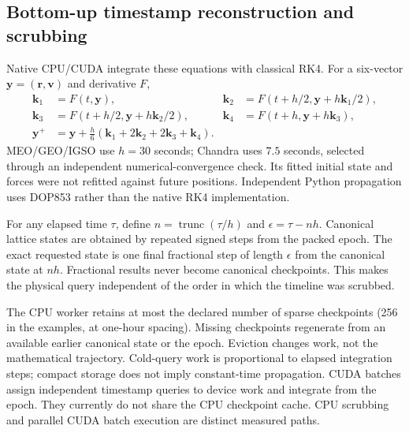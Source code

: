 \subsection{Bottom-up timestamp reconstruction and scrubbing}
Native CPU/CUDA integrate these equations with classical RK4. For a six-vector
$\mathbf y=(\mathbf r,\mathbf v)$ and derivative $F$,
\begin{align}
\mathbf k_1&=F(t,\mathbf y),&
\mathbf k_2&=F(t+h/2,\mathbf y+h\mathbf k_1/2),\\
\mathbf k_3&=F(t+h/2,\mathbf y+h\mathbf k_2/2),&
\mathbf k_4&=F(t+h,\mathbf y+h\mathbf k_3),\\
\mathbf y^+&=\mathbf y+\tfrac h6(\mathbf k_1+2\mathbf k_2+2\mathbf k_3+\mathbf k_4).
\end{align}
MEO/GEO/IGSO use $h=30$ seconds; Chandra uses $7.5$ seconds, selected through an
independent numerical-convergence check. Its fitted initial state and forces
were not refitted against future positions. Independent Python propagation uses
DOP853 rather than the native RK4 implementation.

For any elapsed time $\tau$, define $n=\operatorname{trunc}(\tau/h)$ and
$\epsilon=\tau-nh$. Canonical lattice states are obtained by repeated signed
steps from the packed epoch. The exact requested state is one final fractional
step of length $\epsilon$ from the canonical state at $nh$. Fractional results
never become canonical checkpoints. This makes the physical query independent
of the order in which the timeline was scrubbed.

The CPU worker retains at most the declared number of sparse checkpoints
(256 in the examples, at one-hour spacing). Missing checkpoints regenerate
from an available earlier canonical state or the epoch. Eviction changes work,
not the mathematical trajectory. Cold-query work is proportional to elapsed
integration steps; compact storage does not imply constant-time propagation.
CUDA batches assign independent timestamp queries to device work and integrate
from the epoch. They currently do not share the CPU checkpoint cache. CPU
scrubbing and parallel CUDA batch execution are distinct measured paths.

